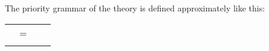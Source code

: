 \begin{isabellebody}
\begin{isamarkuptext}
\begin{center}
\begin{tabular}{rclc}
  \end{tabular}
  \end{center}%
\end{isamarkuptext}%
\isamarkuptrue%
%
\isamarkuptrue%
%
\begin{isamarkuptext}%
The priority grammar of the  theory is defined
  approximately like this:

  \begin{center}
  \begin{supertabular}{rclr}

  \hypertarget{syntax.inner.any}{\hyperlink{syntax.inner.any}{\mbox{}}} & = &  \\\\


\end{supertabular}
\end{center}
\end{isamarkuptext}
\end{isabellebody}
